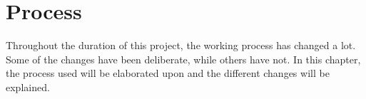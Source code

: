 \chapter{Process}
Throughout the duration of this project, the working process has changed a lot.
Some of the changes have been deliberate, while others have not.
In this chapter, the process used will be elaborated upon and the different changes will be explained.
